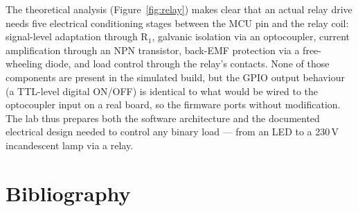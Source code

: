 \documentclass[12pt]{article}
\begin{document}
\hspace{0.8cm}
The theoretical analysis (Figure~\ref{fig:relay}) makes clear that an actual relay drive needs five electrical conditioning stages between the MCU pin and the relay coil: signal-level adaptation through R$_1$, galvanic isolation via an optocoupler, current amplification through an NPN transistor, back-EMF protection via a free-wheeling diode, and load control through the relay's contacts. None of those components are present in the simulated build, but the GPIO output behaviour (a TTL-level digital ON/OFF) is identical to what would be wired to the optocoupler input on a real board, so the firmware ports without modification. The lab thus prepares both the software architecture and the documented electrical design needed to control any binary load --- from an LED to a 230\,V incandescent lamp via a relay.

\section{Bibliography}

\begingroup
\makeatletter
\renewcommand{\section}[2]{}
\makeatother
\end{document}
